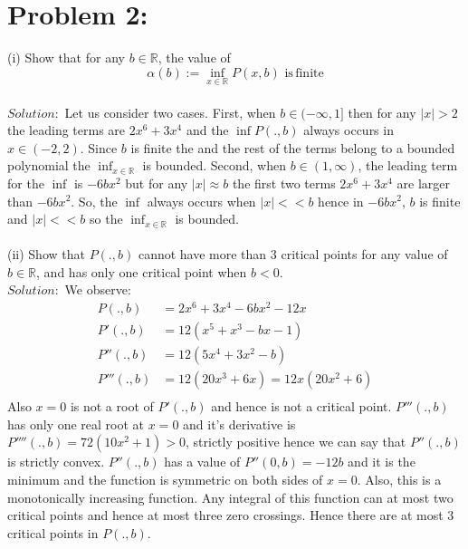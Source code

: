 \documentclass[12pt]{report}
\begin{document}
\section*{Problem 2:}
(i) Show that for any $b\in\mathbb{R}$, the value of $$\alpha(b):=\inf_{x\in\mathbb{R}}P(x,b) \,\,  \mathrm{is\,finite}$$\\
$Solution:$ Let us consider two cases. First, when $b\in(-\infty,1]$ then for any $|x|>2$ the leading terms are $2x^6 + 3x^4$ and
the $\inf P(.,b)$ always occurs in $x\in (-2,2)$. Since $b$ is finite the and the rest of the terms belong to a bounded polynomial
the $\inf_{x \in \mathbb{R}}$ is bounded. Second, when $b\in (1,\infty )$, the leading term for the $\inf$ is $-6bx^2$ but
for any $|x|\approx b$ the first two terms $2x^6 + 3x^4$ are larger than $-6bx^2$. So, the $\inf$ always occurs when $|x|<<b$
hence in $-6bx^2$, $b$ is finite and $|x|<<b$ so the $\inf_{x \in \mathbb{R}}$ is bounded.
\\
\\
(ii) Show that $P(.,b)$ cannot have more than 3 critical points for any value of $b\in\mathbb{R}$, and has only one critical
point when $b<0$.\\
$Solution:$ We observe:
\begin{align*}
P(.,b) &= 2x^6+3x^4-6bx^2-12x \\
P'(.,b) &= 12(x^5+x^3-bx-1) \\
P''(.,b) &= 12(5x^4+3x^2-b) \\
P'''(.,b) &= 12(20x^3+6x) = 12x(20x^2+6)\\
\end{align*}
Also $x=0$ is not a root of $P'(.,b)$ and hence is not a critical point. $P'''(.,b)$ has only one real root at $x=0$
and it's derivative is $P''''(.,b)=72(10x^2+1)>0$, strictly positive hence we can say that $P''(.,b)$ is strictly convex. $P''(.,b)$
has a value of $P''(0,b)=-12b$ and it is the minimum and the function is symmetric on both sides of $x=0$.  Also, this is a
monotonically increasing function. Any integral of this function can at most two critical points and hence at most three zero
crossings. Hence there are at most 3 critical points in $P(.,b)$.
\end{document}
